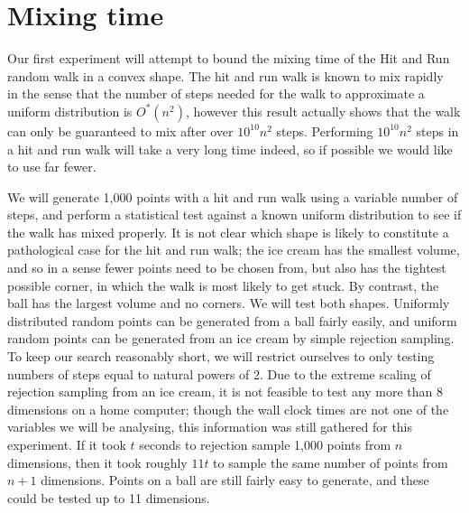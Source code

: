 \section{Mixing time}\label{sec_mix}

Our first experiment will attempt to bound the mixing time of the Hit and Run random walk in a convex shape. The hit and run walk is known to mix rapidly~\cite{Lovasz98, Lovasz05} in the sense that the number of steps needed for the walk to approximate a uniform distribution is $O^{*}(n^2)$, however this result actually shows that the walk can only be guaranteed to mix after over $10^{10} n^2$ steps. Performing $10^{10} n^2$ steps in a hit and run walk will take a very long time indeed, so if possible we would like to use far fewer.

We will generate 1,000 points with a hit and run walk using a variable number of steps, and perform a statistical test against a known uniform distribution to see if the walk has mixed properly. It is not clear which shape is likely to constitute a pathological case for the hit and run walk; the ice cream has the smallest volume, and so in a sense fewer points need to be chosen from, but also has the tightest possible corner, in which the walk is most likely to get stuck. By contrast, the ball has the largest volume and no corners. We will test both shapes. Uniformly distributed random points can be generated from a ball fairly easily, and uniform random points can be generated from an ice cream by simple rejection sampling. To keep our search reasonably short, we will restrict ourselves to only testing numbers of steps equal to natural powers of 2. Due to the extreme scaling of rejection sampling from an ice cream, it is not feasible to test any more than 8 dimensions on a home computer; though the wall clock times are not one of the variables we will be analysing, this information was still gathered for this experiment. If it took $t$ seconds to rejection sample 1,000 points from $n$ dimensions, then it took roughly $11t$ to sample the same number of points from $n+1$ dimensions. Points on a ball are still fairly easy to generate, and these could be tested up to 11 dimensions.


